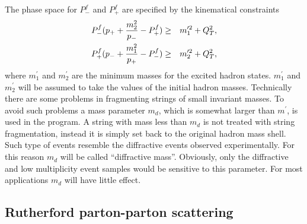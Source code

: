 The phase space for $P_-^f$ and $P_+^f$ are specified by the kinematical
constraints
\begin{eqnarray}
\label{pphas}
 P_-^f (p_++{m_2^2\over p_-} - P_+^f) &\geq& m_1^{\prime 2} + Q_T^2, \nonumber\\
 P_+^f (p_-+{m_1^2\over p_+} - P_-^f) &\geq& m_2^{\prime 2} + Q_T^2,
\end{eqnarray}
where $m_1^{\prime }$ and $m_2^{\prime }$ are the minimum masses for
the excited hadron states.  $m_1^{\prime }$ and $m_2^{\prime }$ will be assumed
to take the values of the initial hadron masses.
Technically there are some problems in fragmenting strings of small 
invariant masses.  To avoid such problems a mass parameter $m_d$, which is
somewhat larger than $m^\prime$,  
is used in the program.  A string
with mass less than $m_d$ is not treated with string fragmentation,
instead it is simply set back to the original hadron mass shell.  
Such type of events resemble the diffractive events observed experimentally.
For this reason $m_d$ will be called ``diffractive mass''.  Obviously,
only the diffractive and low multiplicity event samples would be
sensitive to this parameter.  For most applications $m_d$ will have little
effect.  

\subsection{Rutherford parton-parton scattering}

